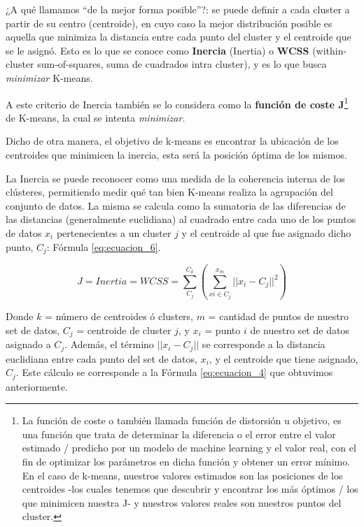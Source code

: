 \documentclass[12pt,a4paper]{article}
\begin{document}
\begin{sloppypar}
¿A qué llamamos “de la mejor forma posible”?: se puede definir a cada cluster a partir de su centro (centroide), en cuyo caso la mejor distribución posible es aquella que minimiza la distancia entre cada punto del cluster y el centroide que se le asignó. Esto es lo que se conoce como \textbf{Inercia} (Inertia) o \textbf{WCSS} (within-cluster sum-of-squares, suma de cuadrados intra cluster), y es lo que busca \textit{minimizar} K-means.

A este criterio de Inercia también se lo considera como la \textbf{función de coste J}\footnote{La función de coste o también llamada función de distorsión u objetivo, es una función que trata de determinar la diferencia o el error entre el valor estimado / predicho por un modelo de machine learning y el valor real, con el fin de optimizar los parámetros en dicha función y obtener un error mínimo. En el caso de k-means, nuestros valores estimados son las posiciones de los centroides -los cuales tenemos que descubrir y encontrar los más óptimos / los que minimicen nuestra J- y nuestros valores reales son nuestros puntos del cluster.} de K-means, la cual se intenta \textit{minimizar}. 

Dicho de otra manera, el objetivo de k-means es encontrar la ubicación de los centroides que minimicen la inercia, esta será la posición óptima de los mismos.

La Inercia\cite{K_means_experiment} se puede reconocer como una medida de la coherencia interna de los clústeres, permitiendo medir qué tan bien K-means realiza la agrupación del conjunto de datos. La misma se calcula como la sumatoria de las diferencias de las distancias (generalmente euclidiana) al cuadrado entre cada uno de los puntos de datos $x_{i}$ pertenecientes a un cluster $j$ y el centroide al que fue asignado dicho punto, $C_{j}$: Fórmula \ref{eq:ecuacion_6}.

\begin{equation}\label{eq:ecuacion_6}
J = Inertia = WCSS = \sum_{C_{j}}^{C_{k}}  ( \sum_{xi \in C_{j}}^{x_{m}}||x_{i}-C_{j}||^2)
\end{equation}

Donde $k$ = número de centroides ó clusters, $m$ = cantidad de puntos de nuestro set de datos, $C_{j}$ = centroide de cluster $j$, y $x_{i}$ = punto $i$ de nuestro set de datos asignado a $C_{j}$. Además, el término $||x_{i}-C_{j}||$ se corresponde a la distancia euclidiana entre cada punto del set de datos, $x_{i}$, y el centroide que tiene asignado, $C_{j}$. Este cálculo se corresponde a la Fórmula \ref{eq:ecuacion_4} que obtuvimos anteriormente.


\end{sloppypar}
\end{document}
